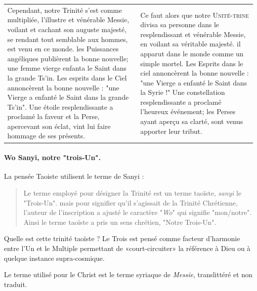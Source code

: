 \begin{tabular}{p{5.5cm}p{5.5cm}}
\\
Cependant, notre Trinité s'est comme multipliée, l'illustre et vénérable Messie, voilant et cachant son auguste majesté, se rendant tout semblable aux hommes, est venu en ce monde. les Puissances angéliques publièrent la bonne nouvelle; une femme vierge enfanta le Saint dans la grande Ts'in. Les esprits dans le Ciel annoncèrent la bonne nouvelle : "une Vierge a enfanté le Saint dans la grande Ts'in". Une étoile resplendissante a proclamé la faveur et la Perse, apercevant son éclat, vint lui faire hommage de ses présents. \cite[p. 35]{Havret:stelechretienne} & 

Ce faut alors que notre \textsc{Unité-trine} divisa sa personne dans le resplendissant et vénérable Messie, en voilant sa véritable majesté. il apparut dans le monde comme un simple mortel. Les Esprits dans le ciel annoncèrent la bonne nouvelle : "une Vierge a enfanté le Saint dans la Syrie !"  Une constellation resplendissante a proclamé l'heureux événement; les Perses ayant aperçu sa clarté, sont venus apporter leur tribut. \cite[p. 9]{Pauthier:linscriptionSinganfou} \\
                                                                                  
\end{tabular}
 
 \paragraph{Wo Sanyi, notre "trois-Un". } La pensée Taoiste utilisent le terme de Sanyi :  

\begin{quote} Le terme employé pour désigner la Trinité est un terme taoïste, \emph{sanyi} le "Trois-Un". mais pour signifier qu'il s'agissait de la Trinité Chrétienne, l'auteur de l'inscription a ajusté le caractère "\emph{Wo}" qui signifie "mon/notre". Ainsi le terme taoïste a pris un sens chrétien, "Notre Trois-Un".
    \cite[p.43]{Raguin:JesusMessieXian}
\end{quote}
Quelle est cette trinité taoïste ? Le Trois est pensé comme facteur d'harmonie entre l'Un et le Multiple permettant de «court-circuiter» la référence à Dieu ou à quelque instance supra-cosmique.\cite{Cheng:triadeChinoise}


Le terme utilisé pour le Christ est le terme syriaque de \textit{Messie}, translittéré et non traduit.

